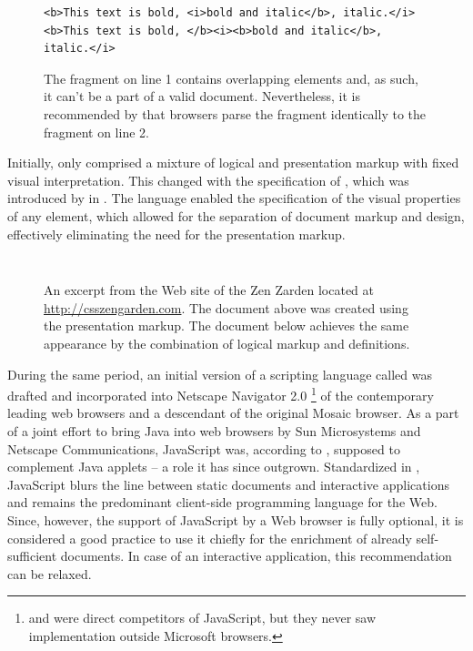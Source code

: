 \documentclass{book}
\begin{document}
\begin{figure}[b]
  \begin{verbatim}
<b>This text is bold, <i>bold and italic</b>, italic.</i>
<b>This text is bold, </b><i><b>bold and italic</b>, italic.</i>
  \end{verbatim}
  \caption{The fragment on line 1 contains overlapping elements and, as such, it
    can't be a part of a valid  document. Nevertheless, it is
    recommended by  that browsers parse the fragment identically to
    the fragment on line 2.}
  \label{fig:overlapping-elements}
\end{figure}

Initially,  only comprised a mixture of logical and presentation
markup with fixed visual interpretation. This changed with the specification of
, which was introduced by  in \cite{lie96}. The
language enabled the specification of the visual properties of any element,
which allowed for the separation of document markup and design, effectively
eliminating the need for the presentation markup.

\begin{figure}
  \inputminted{html}{examples/02/presentation-markup.html}
  \caption{An excerpt from the Web site of the  Zen Zarden
    located at \protect\url{http://csszengarden.com}. The document above was
    created using the  presentation markup. The document below
    achieves the same appearance by the combination of logical markup and
     definitions.}\bigskip
  \inputminted{html}{examples/02/logical-markup.html}
\end{figure}

During the same period, an initial version of a scripting language called
 was drafted and incorporated into Netscape Navigator 2.0%
\footnote{
   and  were direct competitors of JavaScript, but
  they never saw implementation outside Microsoft browsers.
} of the contemporary leading web browsers and a descendant of the original
Mosaic browser. As a part of a joint effort to bring Java into web browsers by
Sun Microsystems and Netscape Communications, JavaScript was, according to
\cite{js-announcement}, supposed to complement Java applets -- a role it has
since outgrown. Standardized in \cite{ecma1}, JavaScript blurs the line between
static documents and interactive applications and remains the predominant
client-side programming language for the Web. Since, however, the support of
JavaScript by a Web browser is fully optional, it is considered a good practice
to use it chiefly for the enrichment of already self-sufficient 
documents. In case of an interactive application, this recommendation can be
relaxed.
\end{document}
